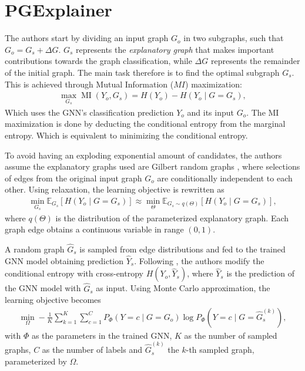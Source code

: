 \section{PGExplainer}\label{sec:PGE}
The authors start by dividing an input graph $G_o$ in two subgraphs, such that $G_o = G_s + \Delta G$. $G_s$ represents the \textit{explanatory graph} that makes important contributions towards the graph classification, while $\Delta G$ represents the remainder of the initial graph. The main task therefore is to find the optimal subgraph $G_s$. This is achieved through Mutual Information ($MI$) maximization:
\begin{align}
    \max _{G_{s}} \operatorname{MI}\left(Y_{o}, G_{s}\right)=H\left(Y_{o}\right)-H\left(Y_{o} \mid G=G_{s}\right),
\end{align}
Which uses the GNN's classification prediction $Y_o$ and its input $G_o$. The MI maximization is done by deducting the conditional entropy from the marginal entropy. Which is equivalent to minimizing the conditional entropy.

To avoid having an exploding exponential amount of candidates, the authors assume the explanatory graphs used are Gilbert random graphs \cite{Gilbert1959}, where selections of edges from the original input graph $G_o$ are conditionally independent to each other. 
Using relaxation, the learning objective is rewritten as
\begin{align}
    \min _{G_{s}} \mathbb{E}_{G_{s}}\left[H\left(Y_{o} \mid G=G_{s}\right)\right] \approx \min _{\Theta} \mathbb{E}_{G_{s} \sim q(\Theta)}\left[H\left(Y_{o} \mid G=G_{s}\right)\right],
\end{align}
where $q(\Theta)$ is the distribution of the parameterized explanatory graph. Each graph edge obtains a continuous variable in range $(0, 1)$.

A random graph $\hat{G}_s$ is sampled from edge distributions and fed to the trained GNN model obtaining prediction $\hat{Y}_s$. Following \cite{ying2019gnnexplainer}, the authors modify the conditional entropy with cross-entropy $H(Y_o,\hat{Y}_s)$, where $\hat{Y}_s$ is the prediction of the GNN model with $\hat{G}_s$ as input. Using Monte Carlo approximation, the learning objective becomes
\begin{align}
    \min _{\Omega}-\frac{1}{K} \sum_{k=1}^{K} \sum_{c=1}^{C} P_{\Phi}\left(Y=c \mid G=G_{o}\right) \log P_{\Phi}\left(Y=c \mid G=\hat{G}_{s}^{(k)}\right),
\end{align}
with $\Phi$ as the parameters in the trained GNN, $K$ as the number of sampled graphs, $C$ as the number of labels and $\hat{G}_s^{(k)}$ the $k$-th sampled graph, parameterized by $\Omega$.

